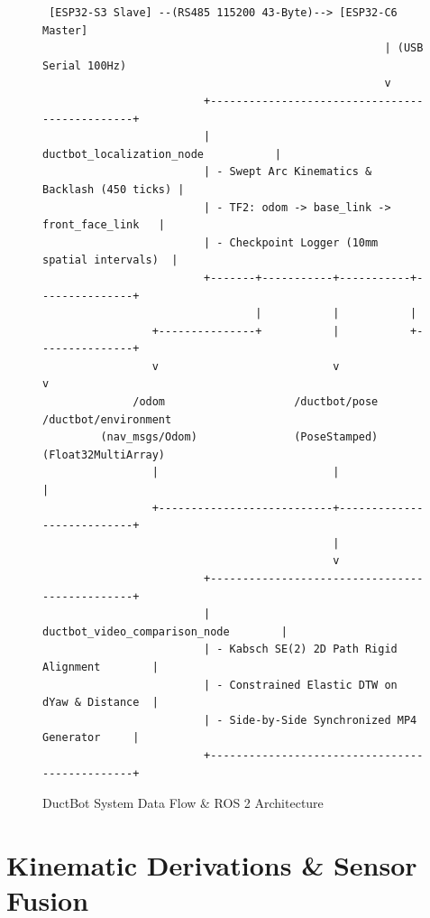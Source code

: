 \documentclass[11pt,a4paper]{article}
\begin{document}
\begin{figure}[h!]
\centering
\begin{verbatim}
 [ESP32-S3 Slave] --(RS485 115200 43-Byte)--> [ESP32-C6 Master]
                                                     | (USB Serial 100Hz)
                                                     v
                         +-----------------------------------------------+
                         |          ductbot_localization_node           |
                         | - Swept Arc Kinematics & Backlash (450 ticks) |
                         | - TF2: odom -> base_link -> front_face_link   |
                         | - Checkpoint Logger (10mm spatial intervals)  |
                         +-------+-----------+-----------+---------------+
                                 |           |           |
                 +---------------+           |           +---------------+
                 v                           v                           v
              /odom                    /ductbot/pose           /ductbot/environment
         (nav_msgs/Odom)               (PoseStamped)            (Float32MultiArray)
                 |                           |                           |
                 +---------------------------+---------------------------+
                                             |
                                             v
                         +-----------------------------------------------+
                         |         ductbot_video_comparison_node        |
                         | - Kabsch SE(2) 2D Path Rigid Alignment        |
                         | - Constrained Elastic DTW on dYaw & Distance  |
                         | - Side-by-Side Synchronized MP4 Generator     |
                         +-----------------------------------------------+
\end{verbatim}
\caption{DuctBot System Data Flow & ROS 2 Architecture}
\end{figure}

\section{Kinematic Derivations \& Sensor Fusion}
\end{document}
